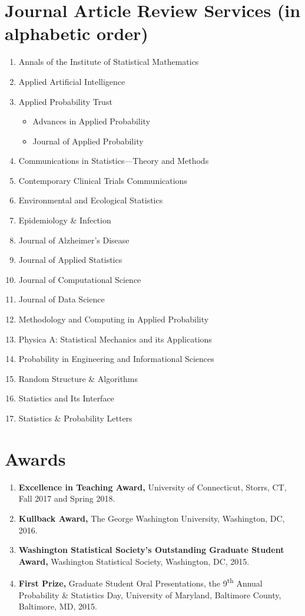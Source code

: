 \documentclass{res}
\begin{document}
\begin{resume}
\section{Journal Article Review Services (in alphabetic order)}
\begin{enumerate}
	\item Annals of the Institute of Statistical Mathematics
	\item Applied Artificial Intelligence
	\item Applied Probability Trust
	\begin{itemize}
		\item Advances in Applied Probability 
		\item Journal of Applied Probability
	\end{itemize}
	\item Communications in Statistics---Theory and Methods
	\item Contemporary Clinical Trials Communications
	\item Environmental and Ecological Statistics
	\item Epidemiology \& Infection
	\item Journal of Alzheimer's Disease
	\item Journal of Applied Statistics
	\item Journal of Computational Science 
	\item Journal of Data Science
	\item Methodology and Computing in Applied Probability
	\item Physica A: Statistical Mechanics and its Applications
	\item Probability in Engineering and Informational Sciences
	\item Random Structure \& Algorithms
	\item Statistics and Its Interface
	\item Statistics \& Probability Letters
\end{enumerate}

\section{Awards}
\begin{enumerate}
	\item {\bf Excellence in Teaching Award,} University of Connecticut, Storrs, CT, Fall 2017 and Spring 2018.
	\item {\bf Kullback Award,} The George Washington University, Washington, DC, 2016.
	\item {\bf Washington Statistical Society's Outstanding Graduate Student Award,} Washington Statistical Society, Washington, DC, 2015.
	\item {\bf First Prize,} Graduate Student Oral Presentations, the 9\textsuperscript{th} Annual Probability \& Statistics Day,  University of Maryland, Baltimore County, Baltimore, MD, 2015.
\end{enumerate}
\end{resume} 
\end{document}
